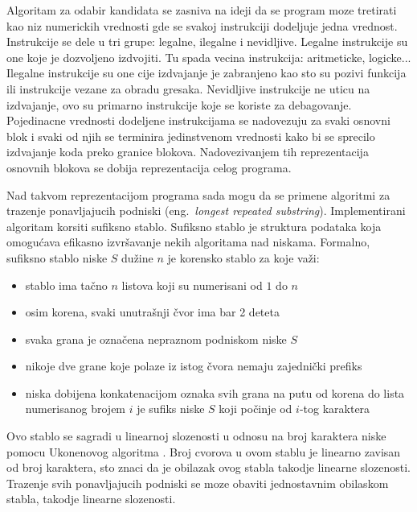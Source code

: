 \documentclass[12pt,oneside]{memoir}
\begin{document}
Algoritam za odabir kandidata se zasniva na ideji da se program moze tretirati kao niz numerickih vrednosti
gde se svakoj instrukciji dodeljuje jedna vrednost.
Instrukcije se dele u tri grupe: legalne, ilegalne i nevidljive.
Legalne instrukcije su one koje je dozvoljeno izdvojiti. Tu spada vecina instrukcija: aritmeticke, logicke...
Ilegalne instrukcije su one cije izdvajanje je zabranjeno kao sto su pozivi funkcija ili instrukcije vezane za obradu gresaka.
Nevidljive instrukcije ne uticu na izdvajanje, ovo su primarno instrukcije koje se koriste za debagovanje.
Pojedinacne vrednosti dodeljene instrukcijama se nadovezuju za svaki osnovni blok i svaki od njih se terminira jedinstvenom vrednosti kako bi se sprecilo izdvajanje koda preko granice blokova.
Nadovezivanjem tih reprezentacija osnovnih blokova se dobija reprezentacija celog programa.


Nad takvom reprezentacijom programa sada mogu da se primene algoritmi za trazenje ponavljajucih podniski (eng.~{\em longest repeated substring}).
Implementirani algoritam korsiti sufiksno stablo.
Sufiksno stablo je struktura podataka koja omogućava efikasno izvršavanje nekih algoritama nad niskama.
Formalno, sufiksno stablo niske $S$ dužine $n$ je korensko stablo za koje važi:
\begin{itemize}
  \item stablo ima tačno $n$ listova koji su numerisani od $1$ do $n$
  \item osim korena, svaki unutrašnji čvor ima bar 2 deteta
  \item svaka grana je označena nepraznom podniskom niske $S$
  \item nikoje dve grane koje polaze iz istog čvora nemaju zajednički prefiks
  \item niska dobijena konkatenacijom oznaka svih grana na putu od korena do lista numerisanog brojem $i$ je sufiks niske $S$ koji počinje od $i$-tog karaktera
\end{itemize}
Ovo stablo se sagradi u linearnoj slozenosti u odnosu na broj karaktera niske pomocu Ukonenovog algoritma \cite{ukkonen1993suffix}.
Broj cvorova u ovom stablu je linearno zavisan od broj karaktera, sto znaci da je obilazak ovog stabla takodje linearne slozenosti.
Trazenje svih ponavljajucih podniski se moze obaviti jednostavnim obilaskom stabla, takodje linearne slozenosti.
\end{document}
